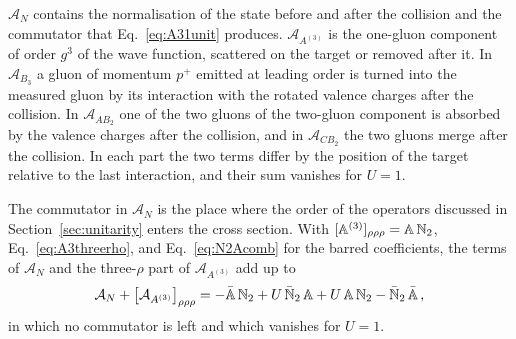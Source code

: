 $\mathcal A_N$ contains the normalisation of the state before and after the collision and the commutator that Eq.~\eqref{eq:A31unit} produces. $\mathcal A_{A^{(3)}}$ is the one-gluon component of order $g^3$ of the wave function, scattered on the target or removed after it. In $\mathcal A_{B_3}$ a gluon of momentum $p^+$ emitted at leading order is turned into the measured gluon by its interaction with the rotated valence charges after the collision. In $\mathcal A_{AB_2}$ one of the two gluons of the two-gluon component is absorbed by the valence charges after the collision, and in $\mathcal A_{CB_2}$ the two gluons merge after the collision. In each part the two terms differ by the position of the target relative to the last interaction, and their sum vanishes for $U=1$.

The commutator in $\mathcal A_N$ is the place where the order of the operators discussed in Section~\ref{sec:unitarity} enters the cross section. With $[\mathbb{A}^{(3)}]_{\rho\rho\rho}=\mathbb{A}\,\mathbb{N}_2$, Eq.~\eqref{eq:A3threerho}, and Eq.~\eqref{eq:N2Acomb} for the barred coefficients, the terms of $\mathcal A_N$ and the three-$\rho$ part of $\mathcal A_{A^{(3)}}$ add up to
\begin{align}\label{eq:Nterms}
\mathcal A_N+\big[\mathcal A_{A^{(3)}}\big]_{\rho\rho\rho}=-\bar{\mathbb{A}}\,\mathbb{N}_2+U\,\bar{\mathbb{N}}_2\,\mathbb{A}+U\,\mathbb{A}\,\mathbb{N}_2-\bar{\mathbb{N}}_2\,\bar{\mathbb{A}}\,,
\end{align}
in which no commutator is left and which vanishes for $U=1$.

